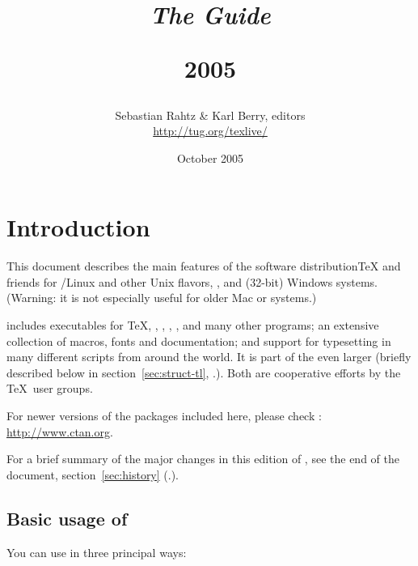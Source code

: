 \documentclass{article}
\begin{document}
\title{%
  {\huge \textit{The \protect\TL{} Guide}\\\strut}
  {\LARGE \textsf{\TK{} 2005}}
}

\author{Sebastian Rahtz \& Karl Berry, editors \\[3mm]
        \url{http://tug.org/texlive/}
       }

\date{October 2005}

\maketitle

\begin{multicols}{2}
\tableofcontents
\listoftables
\end{multicols}

\section{Introduction}
\label{sec:intro}

This document describes the main features of the \TL{} software
distribution\Dash \TeX{} and friends for /Linux and other Unix
flavors, \MacOSX, and (32-bit) Windows systems.  (Warning: it is not
especially useful for older Mac or  systems.)

\TL{} includes executables for \TeX{}, \LaTeXe{}, \ConTeXt, \MF, \MP,
\BibTeX{} and many other programs; an extensive collection of macros,
fonts and documentation; and support for typesetting in many different
scripts from around the world.  It is part of the even larger \TK{}
(briefly described below in section~\ref{sec:struct-tl},
\p.\pageref{sec:struct-tl}).  Both are cooperative efforts by the \TeX\
user groups.

For newer versions of the packages included here, please check
: \url{http://www.ctan.org}.

For a brief summary of the major changes in this edition of \TL{},
see the end of the document, section~\ref{sec:history}
(\p.\pageref{sec:history}).


\subsection{Basic usage of \protect\TL{}}
\label{sec:basic}

You can use \TL{} in three principal ways:
\end{document}
